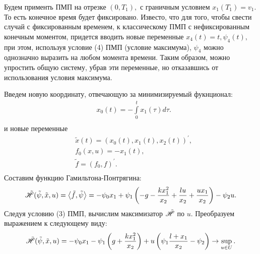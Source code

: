 \documentclass[10pt,pdf,hyperref={unicode}]{beamer}
\begin{document}
	Будем применть ПМП на отрезке $(0, T_1),$ с граничным условием $x_1(T_1) = v_1.$
	То есть конечное время будет фиксировано. Известо, что для того, чтобы свести случай с 
	фиксированным временем, к классическому ПМП с нефиксированным конечным моментом, 
	придется вводить новые переменные $x_4(t) = t, \psi_4(t),$ при этом, используя условие (4) ПМП (условие максимума), 
	$\psi_4$ можно однозначно выразить на любом момента времени. Таким образом, можно упростить общую систему, 
	убрав эти переменные, но отказавшись от использования условия максимума.

	Введем новую координату, отвечающую за минимизируемый фукнционал:
	\[
	\begin{aligned}
	& x_0(t) = -\int \limits_0^{t} x_1(\tau)d\tau.\\
	\end{aligned}
	\]
	и новые переменные
	\[
	\begin{aligned}
	& \tilde x(t) = (x_0(t), x_1(t), x_2(t)) ^ \prime, \\
	& f_0(x, u) = -x_1(t), \\
	& \tilde f = (f_0, f)^\prime.\\
	\end{aligned}
	\]
	Составим функцию Гамильтона-Понтрягина:
	\[
	\tilde {{\mathscr{H}}}(\tilde \psi, \tilde x, u) = \left<\tilde f,\tilde \psi\right> = 
	-\psi_0 x_1 + 
	\psi_1\left(-g - \frac{k x_1^2}{x_2} + \frac{lu}{x_2} + \frac{u x_1}{x_2}   \right) - 
	\psi_2 u.
	\]
	Следуя условию (3) ПМП, вычислим максимизатор $\tilde {{\mathscr{H}}}$ по $u.$ 
	Преобразуем выражением к следующему виду:
	\[
	\tilde {{\mathscr{H}}}(\tilde \psi, \tilde x, u) = 
	-\psi_0 x_1 - 
	\psi_1\left(g + \frac{kx_1^2}{x_2}   \right) + 
	u\left(\psi_1\frac{l + x_1}{x_2} - \psi_2  \right) \rightarrow \sup \limits_{u \in U}.
	\]
\end{document}
